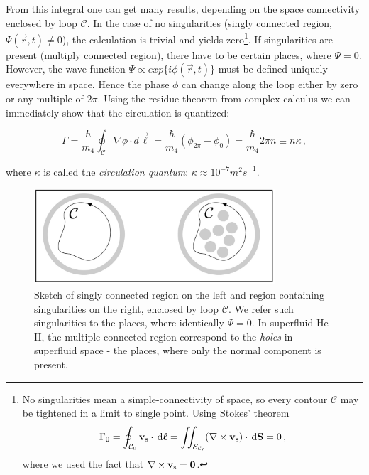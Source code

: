 From this integral one can get many results, depending on the space connectivity enclosed by loop $ \mathcal{C} $. In the case of no singularities (singly connected region, $ \Psi(\vec{r},t)\neq 0 $), the calculation is trivial and yields zero\footnote{No singularities mean a simple-connectivity of space, so every contour $ \mathcal{C} $ may be tightened in a limit to single point. Using Stokes' theorem
$$\Gamma_0
= \oint_{\mathcal{C}_0} \mathbf{v_{\mathrm{s}}} \cdot \,\mathrm{d}\mathbf{\boldsymbol{\ell}}
= \iint_{\mathcal{S_{\mathcal{C}_0}}} (\nabla \times \mathbf{v_{\mathrm{s}}})\cdot\,\mathrm{d}\mathbf{S} = 0\,, $$
where we used the fact that $ \nabla \times \mathbf{v}_{\mathrm{s}} = \mathbf{0} $.
}. If singularities are present (multiply connected region), there have to be certain places, where $ \Psi = 0 $. However, the wave function $\Psi\!\propto\!\unit{exp}\{i\phi(\vec{r},t)\} $ must be defined uniquely everywhere in space. Hence the phase $\phi$ can change along the loop either by zero or any multiple of $2\pi$. Using the residue theorem from complex calculus we can immediately show that the circulation is quantized:

\begin{equation}
\Gamma
= \frac{\hbar}{m_4} \oint_{\mathcal{C}} \nabla \phi \cdot \unit{d} \vec{\boldsymbol{\ell}}
= \frac{\hbar}{m_4} (\phi_{2\pi} -\phi_0)
= \frac{\hbar}{m_4} 2\pi n
\equiv n \kappa\,,
\label{nkappa}
\end{equation}

where $\kappa$ is called the \textit{circulation quantum}: $\kappa \approx 10^{-7}\unit{m^2 \dot s^{-1}}$.

\begin{figure}[h]
\centering
\vspace{0.5cm}
\includegraphics[width=0.8\textwidth]{graphics/singularity}
\caption{Sketch of singly connected region on the left and region containing singularities on the right, enclosed by loop $ \mathcal{C} $. We refer such singularities to the places, where identically $ \Psi = 0 $. In superfluid He-II, the multiple connected region correspond to the \textit{holes} in superfluid space - the places, where only the normal component is present.
}
\end{figure}


